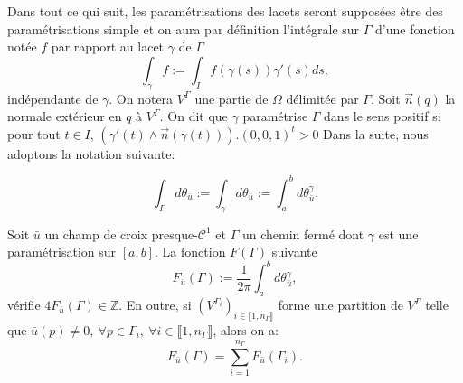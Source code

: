 Dans tout ce qui suit, les paramétrisations des lacets seront supposées être des paramétrisations simple et on aura par définition l'intégrale sur $\Gamma$ d'une fonction notée $f$ par rapport au lacet $\gamma$ de $\Gamma$
$$
\int_\gamma f:=\int_If(\gamma(s))\gamma'(s)ds,
$$
indépendante de $\gamma$. On notera $V^\Gamma$ une partie de $\Omega$ délimitée par $\Gamma$. Soit $\overrightarrow{n}(q)$ la normale extérieur en $q$ à $V^\Gamma$. On dit que $\gamma$ paramétrise $\Gamma$ dans le sens positif si pour tout $t\in I$, $(\gamma'(t)\wedge\overrightarrow{n}(\gamma(t))).(0,0,1)^t>0$ Dans la suite, nous adoptons la notation suivante:

$$
\int_\Gamma d\theta_{\bar{u}}:=\int_\gamma d\theta_{\bar{u}}:=\int_a^b d\theta_{\bar{u}}^\gamma.
$$

\begin{lemma}
    \label{lem:index_saga_first}
    Soit $\bar{u}$ un champ de croix presque-$\mathcal{C}^1$ et $\Gamma$ un chemin fermé dont $\gamma$ est une paramétrisation sur $[a,b]$. La fonction $F(\Gamma)$ suivante
    $$
    F_{\bar{u}}(\Gamma):=\frac{1}{2\pi}\int_a^b d\theta_{\bar{u}}^\gamma,
    $$
    vérifie $4F_{\bar{u}}(\Gamma)\in\mathbb{Z}$. En outre, si $(V^{\Gamma_i})_{i\in\llbracket 1, n_\Gamma\rrbracket}$ forme une partition de $V^\Gamma$ telle que $\bar{u}(p)\neq 0,~\forall p\in\Gamma_i,~\forall i\in\llbracket 1, n_\Gamma\rrbracket$, alors on a:
    \begin{equation}
        F_{\bar{u}}(\Gamma)=\sum_{i=1}^{n_\Gamma}F_{\bar{u}}(\Gamma_i).
        \label{eqn:sum_F_u}
    \end{equation}
\end{lemma}

